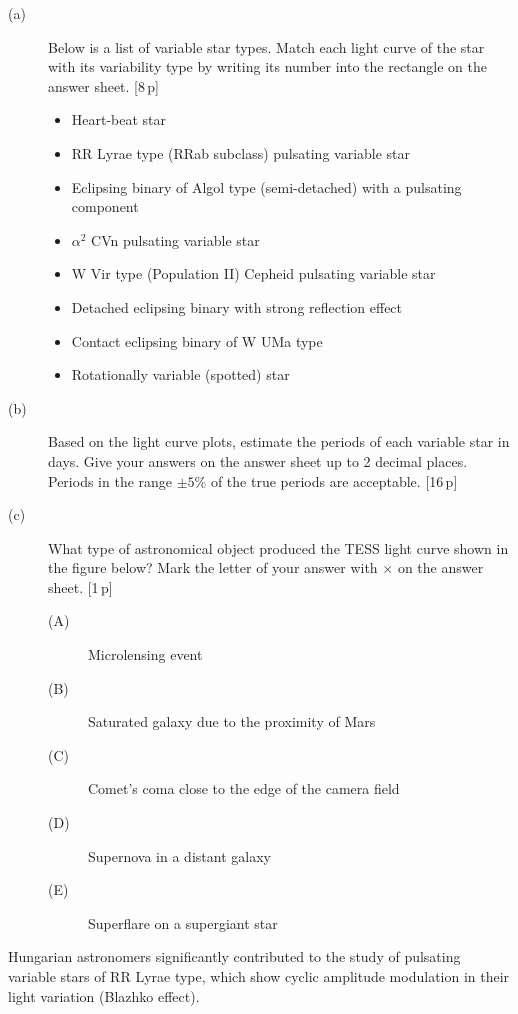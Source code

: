 \begin{description}
\item[(a)] Below is a list of variable star types. Match each light curve of
  the star with its variability type by writing its number into the rectangle
  on the answer sheet. \hfill[8\,p]
  \begin{itemize}
  \item Heart-beat star
  \item RR Lyrae type (RRab subclass) pulsating variable star
  \item Eclipsing binary of Algol type (semi-detached) with a pulsating
    component
  \item $\alpha^2$ CVn pulsating variable star
  \item W Vir type (Population II) Cepheid pulsating variable star
  \item Detached eclipsing binary with strong reflection effect
  \item Contact eclipsing binary of W UMa type
  \item Rotationally variable (spotted) star
  \end{itemize}
\item[(b)] Based on the light curve plots, estimate the periods of each
  variable star in days. Give your answers on the answer sheet up to 2
  decimal places. Periods in the range $\pm5$\% of the true periods are
  acceptable. \hfill[16\,p]
\item[(c)] What type of astronomical object produced the TESS light curve
  shown in the figure below? Mark the letter of your answer with $\times$ on
  the answer sheet. \hfill[1\,p]
  \begin{description}
  \item[(A)] Microlensing event
  \item[(B)] Saturated galaxy due to the proximity of Mars
  \item[(C)] Comet's coma close to the edge of the camera field
  \item[(D)] Supernova in a distant galaxy
  \item[(E)] Superflare on a supergiant star
  \end{description}
\end{description}

Hungarian astronomers significantly contributed to the study of pulsating
variable stars of RR Lyrae type, which show cyclic amplitude modulation in
their light variation (Blazhko effect).

